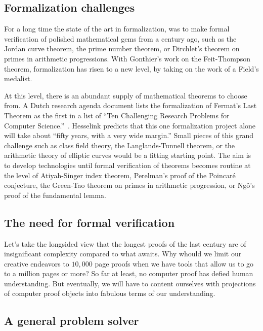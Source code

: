 \documentclass{llncs}
\begin{document}
\subsection{Formalization challenges}

For a long time the state of the art in formalization, was to make
formal verification of polished mathematical gems from a century ago,
such as the Jordan curve theorem, the prime number theorem, or
Dirchlet's theorem on primes in arithmetic progressions.  With
Gonthier's work on the Feit-Thompson theorem, formalization has risen
to a new level, by taking on the work of a Field's medalist.

At this level, there is an abundant supply of mathematical theorems to
choose from.  A Dutch research agenda document
lists the formalization of Fermat's Last Theorem as the first in a
list of ``Ten Challenging Research Problems for Computer
Science.''~\cite{Berg}.  Hesselink predicts that this one
formalization project alone will take about ``fifty years, with a very
wide margin.''
Small pieces of this grand challenge such as class field theory, the
Langlands-Tunnell theorem, or the arithmetic theory of elliptic curves
would be a fitting starting point.  The aim is to develop
technologies until formal verification of theorems
becomes routine at the level of Atiyah-Singer index theorem,
Perelman's proof of the Poincar\'e conjecture, the Green-Tao theorem
on primes in arithmetic progression, or Ng\^o's proof of the
fundamental lemma.

\subsection{The need for formal verification}

Let's take the longsided view that the longest proofs of the last century 
are of insignificant complexity compared to what awaits.
Why whould we limit our creative endeavors to $10,000$ page proofs when we have tools
that allow us to go to a million pages or more?  So far at least, no computer proof
has defied human understanding.  But eventually, we will have to content ourselves
with projections of computer proof objects into fabulous terms of our understanding.


\subsection{A general problem solver}
\end{document}
